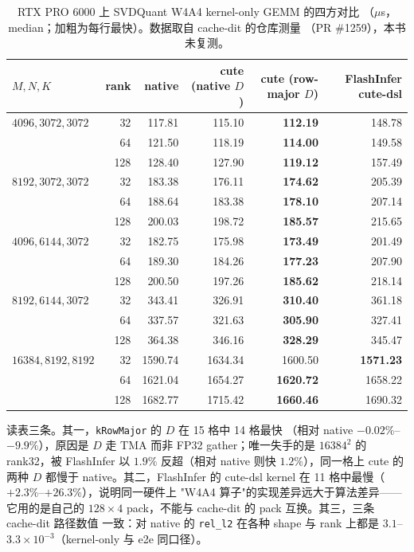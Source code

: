 \begin{table}[H]
\centering\small
\caption{RTX PRO 6000 上 SVDQuant W4A4 kernel-only GEMM 的四方对比
（$\mu$s，median；加粗为每行最快）。数据取自 cache-dit 的仓库测量
（PR \#1259），本书未复测。}
\label{tab:40-pro6000}
\begin{tabular}{@{}lrrrrr@{}}
\toprule
$M,N,K$ & rank & native & cute (native $D$) & cute (row-major $D$) & FlashInfer cute-dsl \\
\midrule
$4096,3072,3072$   & 32  & 117.81 & 115.10 & \textbf{112.19} & 148.78 \\
                   & 64  & 121.50 & 118.19 & \textbf{114.00} & 149.58 \\
                   & 128 & 128.40 & 127.90 & \textbf{119.12} & 157.49 \\
$8192,3072,3072$   & 32  & 183.38 & 176.11 & \textbf{174.62} & 205.39 \\
                   & 64  & 188.64 & 183.38 & \textbf{178.10} & 207.14 \\
                   & 128 & 200.03 & 198.72 & \textbf{185.57} & 215.65 \\
$4096,6144,3072$   & 32  & 182.75 & 175.98 & \textbf{173.49} & 201.49 \\
                   & 64  & 189.30 & 184.26 & \textbf{177.23} & 207.90 \\
                   & 128 & 200.50 & 197.26 & \textbf{185.62} & 218.14 \\
$8192,6144,3072$   & 32  & 343.41 & 326.91 & \textbf{310.40} & 361.18 \\
                   & 64  & 337.57 & 321.63 & \textbf{305.90} & 327.41 \\
                   & 128 & 364.38 & 346.16 & \textbf{328.29} & 345.47 \\
$16384,8192,8192$  & 32  & 1590.74 & 1634.34 & 1600.50 & \textbf{1571.23} \\
                   & 64  & 1621.04 & 1654.27 & \textbf{1620.72} & 1658.22 \\
                   & 128 & 1682.77 & 1715.42 & \textbf{1660.46} & 1690.32 \\
\bottomrule
\end{tabular}
\end{table}

读表三条。其一，\texttt{kRowMajor} 的 $D$ 在 15 格中 14 格最快
（相对 native $-0.02\%$--$-9.9\%$），原因是 $D$ 走 TMA 而非 FP32
gather；唯一失手的是 $16384^2$ 的 rank32，被 FlashInfer 以 $1.9\%$
反超（相对 native 则快 $1.2\%$），同一格上 cute 的两种 $D$ 都慢于 native。其二，FlashInfer 的
cute-dsl kernel 在 11 格中最慢（$+2.3\%$--$+26.3\%$），说明同一硬件上
"W4A4 算子"的实现差异远大于算法差异——它用的是自己的 $128\times4$
pack，不能与 cache-dit 的 pack 互换。其三，三条 cache-dit 路径数值
一致：对 native 的 \texttt{rel\_l2} 在各种 shape 与 rank 上都是
$3.1$--$3.3\times10^{-3}$（kernel-only 与 e2e 同口径）。

